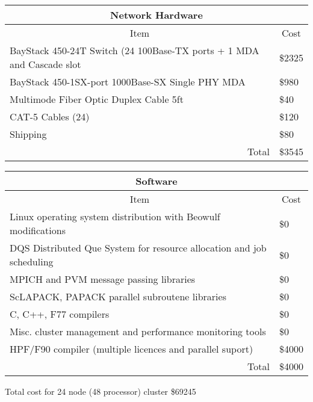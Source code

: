 \documentclass{article}
\begin{document}
\newline
\begin{tabular}
[c]{|c|c|}\hline\hline
\multicolumn{2}{|c|}{Network Hardware}\\\hline\hline
Item & Cost\\
\multicolumn{1}{|l|}{BayStack 450-24T Switch (24 100Base-TX ports + 1 MDA and
Cascade slot} & \multicolumn{1}{|l|}{\$2325}\\
\multicolumn{1}{|l|}{BayStack 450-1SX-port 1000Base-SX Single PHY MDA} &
\multicolumn{1}{|l|}{\$980}\\
\multicolumn{1}{|l|}{Multimode Fiber Optic Duplex Cable 5ft} &
\multicolumn{1}{|l|}{\$40}\\
\multicolumn{1}{|l|}{CAT-5 Cables (24)} & \multicolumn{1}{|l|}{\$120}\\\hline
\multicolumn{1}{|l|}{Shipping} & \multicolumn{1}{|l|}{\$80}\\\hline
\multicolumn{1}{|r|}{Total} & \multicolumn{1}{|l|}{\$3545}\\\hline
\end{tabular}

\bigskip%
\begin{tabular}
[c]{|c|c|}\hline\hline
\multicolumn{2}{|c|}{Software}\\\hline\hline
Item & Cost\\
\multicolumn{1}{|l|}{Linux operating system distribution with Beowulf
modifications} & \multicolumn{1}{|l|}{\$0}\\
\multicolumn{1}{|l|}{DQS Distributed Que System for resource allocation and
job scheduling} & \multicolumn{1}{|l|}{\$0}\\
\multicolumn{1}{|l|}{MPICH and PVM message passing libraries} &
\multicolumn{1}{|l|}{\$0}\\
\multicolumn{1}{|l|}{ScLAPACK, PAPACK parallel subroutene libraries} &
\multicolumn{1}{|l|}{\$0}\\
\multicolumn{1}{|l|}{C, C++, F77 compilers} & \multicolumn{1}{|l|}{\$0}%
\\\hline
\multicolumn{1}{|l|}{Misc. cluster management and performance monitoring
tools} & \multicolumn{1}{|l|}{\$0}\\\hline
\multicolumn{1}{|l|}{HPF/F90 compiler (multiple licences and parallel suport)}%
& \multicolumn{1}{|l|}{\$4000}\\\hline
\multicolumn{1}{|r|}{Total} & \multicolumn{1}{|l|}{\$4000}\\\hline
\end{tabular}

\bigskip

Total cost for 24 node (48 processor) cluster \$69245
\end{document}
